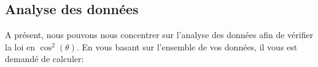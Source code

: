 \subsection{Analyse des données}

A présent, nous pouvons nous concentrer sur l'analyse des données afin de vérifier la loi en \(\cos^2(\theta)\).
En vous basant sur l'ensemble de vos données, il vous est demandé de calculer:

\begin{center}
\end{center}
